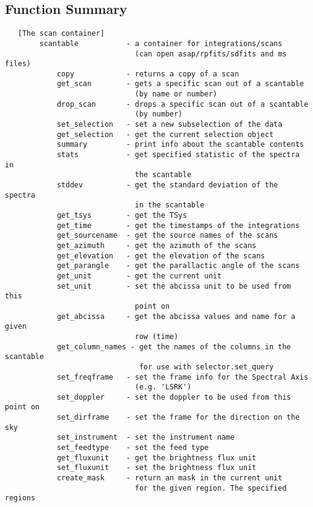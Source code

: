 \documentclass[11pt]{article}
\begin{document}
\subsection{Function Summary}

%
\begin{verbatim}
   [The scan container]
        scantable           - a container for integrations/scans
                              (can open asap/rpfits/sdfits and ms files)
            copy            - returns a copy of a scan
            get_scan        - gets a specific scan out of a scantable
                              (by name or number)
            drop_scan       - drops a specific scan out of a scantable
                              (by number)
            set_selection   - set a new subselection of the data
            get_selection   - get the current selection object
            summary         - print info about the scantable contents
            stats           - get specified statistic of the spectra in
                              the scantable
            stddev          - get the standard deviation of the spectra
                              in the scantable
            get_tsys        - get the TSys
            get_time        - get the timestamps of the integrations
            get_sourcename  - get the source names of the scans
            get_azimuth     - get the azimuth of the scans
            get_elevation   - get the elevation of the scans
            get_parangle    - get the parallactic angle of the scans
            get_unit        - get the current unit
            set_unit        - set the abcissa unit to be used from this
                              point on
            get_abcissa     - get the abcissa values and name for a given
                              row (time)
            get_column_names - get the names of the columns in the scantable
                               for use with selector.set_query
            set_freqframe   - set the frame info for the Spectral Axis
                              (e.g. 'LSRK')
            set_doppler     - set the doppler to be used from this point on
            set_dirframe    - set the frame for the direction on the sky
            set_instrument  - set the instrument name
            set_feedtype    - set the feed type
            get_fluxunit    - get the brightness flux unit
            set_fluxunit    - set the brightness flux unit
            create_mask     - return an mask in the current unit
                              for the given region. The specified regions

\end{verbatim}
\end{document}
